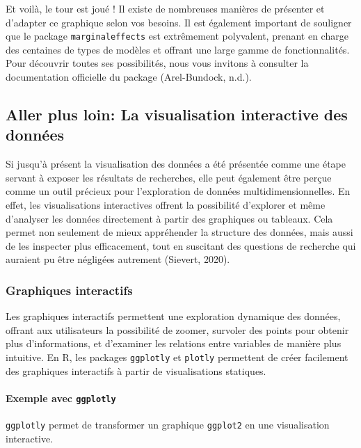 \documentclass[
  letterpaper,
  DIV=11,
  numbers=noendperiod]{scrreprt}
\let\oldparagraph\paragraph
\renewcommand{\paragraph}[1]{\oldparagraph{#1}\mbox{}}
\begin{document}
Et voilà, le tour est joué ! Il existe de nombreuses manières de
présenter et d'adapter ce graphique selon vos besoins. Il est également
important de souligner que le package \texttt{marginaleffects} est
extrêmement polyvalent, prenant en charge des centaines de types de
modèles et offrant une large gamme de fonctionnalités. Pour découvrir
toutes ses possibilités, nous vous invitons à consulter la documentation
officielle du package (Arel-Bundock, n.d.).

\subsection{Aller plus loin: La visualisation interactive des
données}\label{aller-plus-loin-la-visualisation-interactive-des-donnuxe9es}

Si jusqu'à présent la visualisation des données a été présentée comme
une étape servant à exposer les résultats de recherches, elle peut
également être perçue comme un outil précieux pour l'exploration de
données multidimensionnelles. En effet, les visualisations interactives
offrent la possibilité d'explorer et même d'analyser les données
directement à partir des graphiques ou tableaux. Cela permet non
seulement de mieux appréhender la structure des données, mais aussi de
les inspecter plus efficacement, tout en suscitant des questions de
recherche qui auraient pu être négligées autrement (Sievert, 2020).

\subsubsection{Graphiques interactifs}\label{graphiques-interactifs}

Les graphiques interactifs permettent une exploration dynamique des
données, offrant aux utilisateurs la possibilité de zoomer, survoler des
points pour obtenir plus d'informations, et d'examiner les relations
entre variables de manière plus intuitive. En R, les packages
\texttt{ggplotly} et \texttt{plotly} permettent de créer facilement des
graphiques interactifs à partir de visualisations statiques.

\paragraph{\texorpdfstring{Exemple avec
\texttt{ggplotly}}{Exemple avec ggplotly}}\label{exemple-avec-ggplotly}

\texttt{ggplotly} permet de transformer un graphique \texttt{ggplot2} en
une visualisation interactive.
\end{document}
